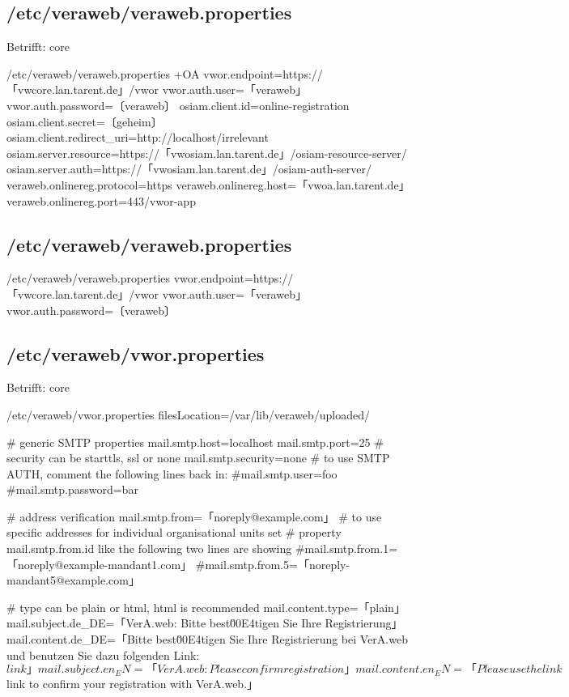 \ifoa

\subsection{/etc/veraweb/veraweb.properties}\label{subsec:refcfg-vw-vwprop}

Betrifft: core

\begin{lstdump}{/etc/veraweb/veraweb.properties +OA}
vwor.endpoint=https://「vwcore.lan.tarent.de」/vwor
vwor.auth.user=「veraweb」
vwor.auth.password=〔veraweb〕
osiam.client.id=online-registration
osiam.client.secret=〔geheim〕
osiam.client.redirect_uri=http://localhost/irrelevant
osiam.server.resource=https://「vwosiam.lan.tarent.de」/osiam-resource-server/
osiam.server.auth=https://「vwosiam.lan.tarent.de」/osiam-auth-server/
veraweb.onlinereg.protocol=https
veraweb.onlinereg.host=「vwoa.lan.tarent.de」
veraweb.onlinereg.port=443/vwor-app
\end{lstdump}

\else%

\subsection{/etc/veraweb/veraweb.properties}\label{subsec:refcfg-vw-vwprop}

\begin{lstdump}{/etc/veraweb/veraweb.properties}
vwor.endpoint=https://「vwcore.lan.tarent.de」/vwor
vwor.auth.user=「veraweb」
vwor.auth.password=〔veraweb〕
\end{lstdump}

\fi%

\subsection{/etc/veraweb/vwor.properties}\label{subsec:refcfg-vw-vworprop}

\ifoa
Betrifft: core
\fi%

\begin{lstdump}{/etc/veraweb/vwor.properties}
filesLocation=/var/lib/veraweb/uploaded/

# generic SMTP properties
mail.smtp.host=localhost
mail.smtp.port=25
# security can be starttls, ssl or none
mail.smtp.security=none
# to use SMTP AUTH, comment the following lines back in:
#mail.smtp.user=foo
#mail.smtp.password=bar

# address verification
mail.smtp.from=「noreply@example.com」
# to use specific addresses for individual organisational units set
# property mail.smtp.from.{id} like the following two lines are showing
#mail.smtp.from.1=「noreply@example-mandant1.com」
#mail.smtp.from.5=「noreply-mandant5@example.com」

# type can be plain or html, html is recommended
mail.content.type=「plain」
mail.subject.de_DE=「VerA.web: Bitte best\u00E4tigen Sie Ihre Registrierung」
mail.content.de_DE=「Bitte best\u00E4tigen Sie Ihre Registrierung bei VerA.web und benutzen Sie dazu folgenden Link: ${link}」
mail.subject.en_EN=「VerA.web: Please confirm registration」
mail.content.en_EN=「Please use the link ${link} to confirm your registration with VerA.web.」
\end{lstdump}
